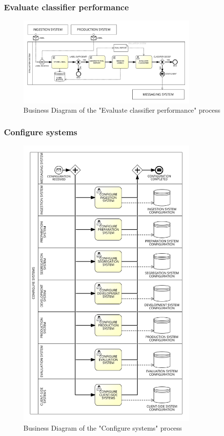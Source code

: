 \subsubsection{Evaluate classifier performance}
\label{sec:bpmn_evaluate_classifier_performance}

\begin{figure}[H]
\centering
\includegraphics[width=0.8\textwidth]{figures/Business Diagram - Evaluate Classifier Performance.png}
\caption{Business Diagram of the "Evaluate classifier performance" process}
\label{fig:bpmn_evaluate_classifier_performance}
\end{figure}

\subsubsection{Configure systems}
\label{sec:bpmn_configure_systems}

\begin{figure}[H]
\centering
\includegraphics[width=0.8\textwidth]{figures/Business Diagram - Configure Systems.png}
\caption{Business Diagram of the "Configure systems" process}
\label{fig:bpmn_configure_systems}
\end{figure}